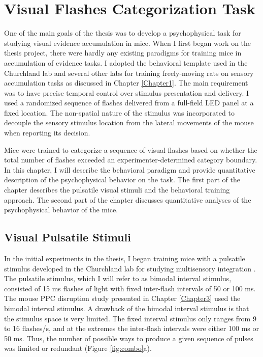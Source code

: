 
\chapter{Visual Flashes Categorization Task} %
\label{Chapter2} %
One of the main goals of the thesis was to develop a psychophysical task for studying visual evidence accumulation in mice. When I first began work on the thesis project, there were hardly any existing paradigms for training mice in accumulation of evidence tasks. I adopted the behavioral template used in the Churchland lab and several other labs for training freely-moving rats on sensory accumulation tasks as discussed in Chapter \ref{Chapter1}. The main requirement was to have precise temporal control over stimulus presentation and delivery. I used a randomized sequence of flashes delivered from a full-field LED panel at a fixed location. The non-spatial nature of the stimulus was incorporated to decouple the sensory stimulus location from the lateral movements of the mouse when reporting its decision. \par 
Mice were trained to categorize a sequence of visual flashes based on whether the total number of flashes exceeded an experimenter-determined category boundary. In this chapter, I will describe the behavioral paradigm and provide quantitative description of the psychophysical behavior on the task. The first part of the chapter describes the pulsatile visual stimuli and the behavioral training approach. The second part of the chapter discusses quantitative analyses of the  psychophysical behavior of the mice. \par 
\section{Visual Pulsatile Stimuli} 
In the initial experiments in the thesis, I began training mice with a pulsatile stimulus developed in the Churchland lab for studying multisensory integration \parencite{Raposo2012a}. The pulsatile stimulus, which I will refer to as bimodal interval stimulus, consisted of 15 ms flashes of light with fixed inter-flash intervals of 50 or 100 ms. The mouse PPC disruption study presented in Chapter \ref{Chapter3} used the bimodal interval stimulus. A drawback of the bimodal interval stimulus is that the stimulus space is very limited. The fixed interval stimulus only ranges from 9 to 16 flashes/s, and at the extremes the inter-flash intervals were either 100 ms or 50 ms. Thus, the number of possible ways to produce a given sequence of pulses was limited or redundant (Figure \ref{fig:combo}a). \par 

